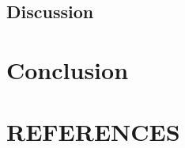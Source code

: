 \documentclass{article}
\begin{document}
\subsection{Discussion}

\section{Conclusion}


\section{REFERENCES}
\label{sec:refs}



\end{document}
